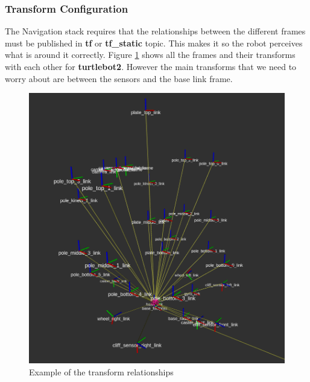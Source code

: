 \subsubsection{Transform Configuration}
The Navigation stack requires that the relationships between the different frames must be published in \textbf{tf} or \textbf{tf\_static} topic. This makes it so the robot perceives what is around it correctly.
Figure \ref{fig:tf} shows all the frames and their transforms with each other for \textbf{turtlebot2}. However the main transforms that we need to worry about are between the sensors and the base link frame.
\begin{figure}[!htb]
    \centering
    \includegraphics[scale=0.4]{imgs/chapter3/tf.png}
    \caption{Example of the transform relationships}
    \label{fig:tf}
\end{figure}

